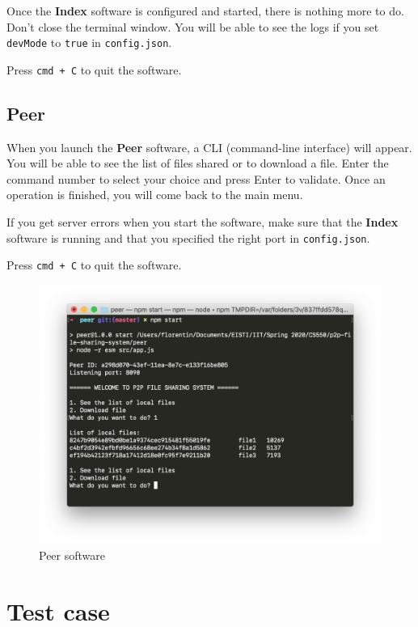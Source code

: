 \documentclass{article}
\begin{document}
Once the \textbf{Index} software is configured and started, there is nothing more to do. Don't close the terminal window. You will be able to see the logs if you set \Verb+devMode+ to \Verb+true+ in \Verb+config.json+.

\noindent Press \Verb|cmd + C| to quit the software.

\subsection{Peer}

When you launch the \textbf{Peer} software, a CLI (command-line interface) will appear. You will be able to see the list of files shared or to download a file. Enter the command number to select your choice and press Enter to validate. Once an operation is finished, you will come back to the main menu.

\noindent If you get server errors when you start the software, make sure that the \textbf{Index} software is running and that you specified the right port in \Verb+config.json+.

\noindent Press \Verb|cmd + C| to quit the software.

\begin{figure}[h!]
	\centering
	\includegraphics[width=0.7\linewidth]{assets/peer.png}
	\caption{Peer software}
	\label{fig:peer}
\end{figure}

\section{Test case}

\end{document}
